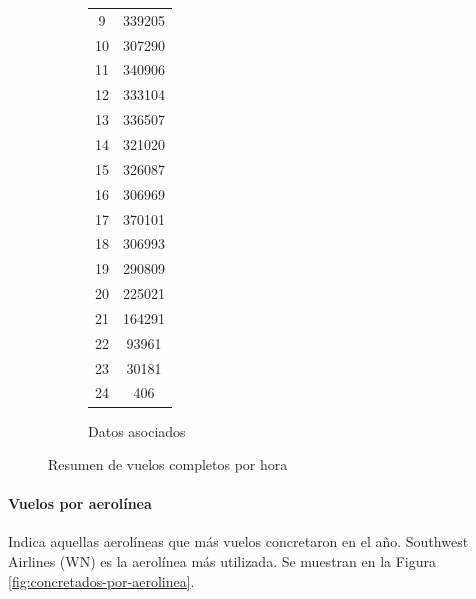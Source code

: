 \documentclass[12pt]{article}
\numberwithin{equation}{section}
\numberwithin{table}{section}
\numberwithin{figure}{section}
\begin{document}
\begin{figure}
\begin{subfigure}[b]{0.3\textwidth}
\begin{tabular}{@{}cc@{}}
9             & 339205            \\
10            & 307290            \\
11            & 340906            \\
12            & 333104            \\
13            & 336507            \\
14            & 321020            \\
15            & 326087            \\
16            & 306969            \\
17            & 370101            \\
18            & 306993            \\
19            & 290809            \\
20            & 225021            \\
21            & 164291            \\
22            & 93961             \\
23            & 30181             \\
24            & 406               \\ \bottomrule
\end{tabular}
\caption{Datos asociados}
        \end{subfigure}
        \caption{Resumen de vuelos completos por hora}
        \label{fig:concretados-por-hora}
\end{figure}


\paragraph{Vuelos por aerolínea}
Indica aquellas aerolíneas que más vuelos concretaron en el año.
Southwest Airlines (WN) es la aerolínea más utilizada.
Se muestran en la Figura \ref{fig:concretados-por-aerolinea}.
\end{document}
